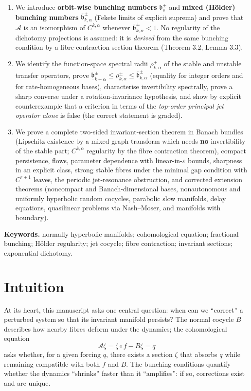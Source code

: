 \documentclass[11pt,a4paper]{article}
\theoremstyle{plain}
\theoremstyle{definition}
\theoremstyle{remark}
\numberwithin{equation}{section}
\numberwithin{figure}{section}
\begin{document}
\begin{enumerate}
\item We introduce \textbf{orbit-wise bunching numbers} $\mathfrak b^\pm_s$ and \textbf{mixed (Hölder) bunching numbers} $\bar{\mathfrak b}^\pm_{k,\alpha}$ (Fekete limits of explicit suprema) and prove that $\mathcal A$ is an isomorphism of $C^{k,\alpha}$ whenever $\bar{\mathfrak b}^\pm_{k,\alpha}<1$. No regularity of the dichotomy projections is assumed: it is \textit{derived} from the same bunching condition by a fibre-contraction section theorem (Theorem 3.2, Lemma 3.3).

\item We identify the function-space spectral radii $\rho^\pm_{k,\alpha}$ of the stable and unstable transfer operators, prove $\underline{\mathfrak b}^\pm_{k+\alpha}\le\rho^\pm_{k,\alpha}\le\bar{\mathfrak b}^\pm_{k,\alpha}$ (equality for integer orders and for rate-homogeneous bases), characterise invertibility spectrally, prove a sharp converse under a rotation-invariance hypothesis, and show by explicit counterexample that a criterion in terms of the \textit{top-order principal jet operator alone} is false (the correct statement is graded).

\item We prove a complete two-sided invariant-section theorem in Banach bundles (Lipschitz existence by a mixed graph transform which needs \textbf{no} invertibility of the stable part; $C^{k,\alpha}$ regularity by the fibre contraction theorem), compact persistence, flows, parameter dependence with linear-in-$\varepsilon$ bounds, sharpness in an explicit class, strong stable fibres under the minimal gap condition with $C^{r+1}$ leaves, the periodic jet-resonance obstruction, and corrected extension theorems (noncompact and Banach-dimensional bases, nonautonomous and uniformly hyperbolic random cocycles, parabolic slow manifolds, delay equations, quasilinear problems via Nash–Moser, and manifolds with boundary).
\end{enumerate}

\textbf{Keywords.} normally hyperbolic manifolds; cohomological equation; fractional bunching; Hölder regularity; jet cocycle; fibre contraction; invariant sections; exponential dichotomy.

\section*{Intuition}

At its heart, this manuscript asks one central question: when can we ``correct'' a perturbed system so that its invariant manifold persists? The normal cocycle $B$ describes how nearby fibres deform under the dynamics; the cohomological equation
\[
\mathcal A\zeta = \zeta\circ f - B\zeta = q
\]
asks whether, for a given forcing $q$, there exists a section $\zeta$ that absorbs $q$ while remaining compatible with both $f$ and $B$. The bunching conditions quantify whether the dynamics ``shrinks'' faster than it ``amplifies'': if so, corrections exist and are unique.
\end{document}
